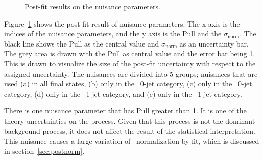 \begin{figure}[!hbtp]
{}
\caption{Post-fit results on the nuisance parameters.}
\label{fig:postnuisance}
\end{figure}
Figure~\ref{fig:postnuisance} shows the post-fit result of nuisance parameters. 
The x axis is the indices of the nuisance parameters, and the y axis is the 
Pull and the $\sigma_{\textrm{norm}}$. The black line shows the Pull 
as the central value and 
$\sigma_{\textrm{norm}}$ as an uncertainty bar. The grey area is drawn with the Pull as 
central value and the error bar being 1. This is drawn to visualize the size of 
the post-fit uncertainty with respect to the assigned uncertainty. 
The nuisances are divided into 5 groups; nuisances that are used (a) in all final states, 
(b) only in the \DF\ 0-jet category,  (c) only in the \SF\ 0-jet category,  
(d) only in the \DF\ 1-jet category,  and (e) only in the \SF\ 1-jet category. 

There is one nuisance parameter that has Pull greater than 1. 
It is one of the theory uncertainties on the \ggww process. 
Given that this process is not the dominant background process, 
it does not affect the result of the statistical interpretation. 
This nuisance causes a large variation of \ggww\ normalization by fit,
which is discussed in section~\ref{sec:postnorm}.

